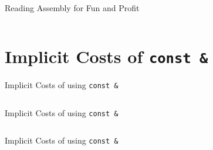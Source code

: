 \documentclass[compress,aspectratio=1610]{beamer}
\newcommand{\inputcpplisting}[1]{}
\newcommand{\inputasmlisting}[1]{}
\begin{document}
\begin{frame}[fragile]{Reading Assembly for Fun and Profit}
    \begin{columns}[t]
        \begin{column}{.45\textwidth}
            \inputcpplisting{snippet6a}

            \only<2>{%
            \inputasmlisting{snippet6b}}
        \end{column}
        \begin{column}{.45\textwidth}
            \inputasmlisting{snippet6a}
        \end{column}
    \end{columns}

\end{frame}

\section{Implicit Costs of \texttt{const \&}}

\begin{frame}[fragile]{Implicit Costs of using \texttt{const \&}}
    \begin{columns}[t]
        \begin{column}{.45\textwidth}
            \inputcpplisting{snippet1a}
        \end{column}
        \begin{column}{.45\textwidth}
            \inputasmlisting{snippet1a}
        \end{column}
    \end{columns}
\end{frame}

\begin{frame}[fragile]{Implicit Costs of using \texttt{const \&}}
    \begin{columns}[t]
        \begin{column}{.45\textwidth}
            \inputcpplisting{snippet2a}
        \end{column}
        \begin{column}{.45\textwidth}
            \inputcpplisting{snippet2b}
        \end{column}
    \end{columns}
\end{frame}

\begin{frame}[fragile]{Implicit Costs of using \texttt{const \&}}
    \begin{columns}[t]
        \begin{column}{.45\textwidth}
            \inputasmlisting{snippet1a}
        \end{column}
        \begin{column}{.45\textwidth}
            \inputasmlisting{snippet2a}
        \end{column}
    \end{columns}
\end{frame}
\end{document}
